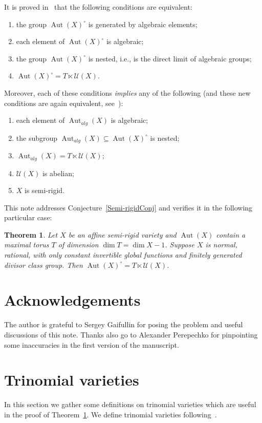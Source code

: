 \documentclass[a4paper,reqno,12pt]{amsart}
\theoremstyle{theorem}
\newtheorem{theorem}{Theorem}[section]
\theoremstyle{definition}
\theoremstyle{theorem}
\theoremstyle{remark}
\DeclareMathOperator{\Aut}{Aut}
\newcommand{\UU}{\mathcal U}
\newcommand{\0}{\circ}
\begin{document}
It is proved in~\cite{PR24} that the following conditions are equivalent:
\begin{enumerate}
    \item[(i)] the group $\Aut(X)^\0$ is generated by algebraic elements;
    \item[(ii)] each element of $\Aut(X)^\circ$ is algebraic;
    \item[(iii)] the group $\Aut(X)^\0$ %
    is nested, i.e., is the direct limit of algebraic groups;
    \item[(iv)] $\Aut(X)^\0 = T\ltimes \UU(X)$.
\end{enumerate}
Moreover, each of these conditions \emph{implies} any of the following (and these new conditions are again equivalent, see~\cite{PR23}):
\begin{enumerate}
    \item[$\bullet$] each element of $\Aut_{alg}(X)$ is algebraic;
    \item[$\bullet$] the subgroup $\Aut_{alg}(X)\subseteq \Aut(X)^\circ$ is nested;
    \item[$\bullet$] $\Aut_{alg}(X) = T\ltimes \UU(X)$;
    \item[$\bullet$] $\UU(X)$ is abelian;
    \item[$\bullet$] $X$ is semi-rigid.
\end{enumerate}

This note addresses Conjecture~\ref{Semi-rigidConj} and verifies it in the following particular case:

\begin{theorem}\label{Theorem}
    Let $X$ be an affine semi-rigid variety and $\Aut(X)$ contain a maximal torus $T$ of dimension $\dim T = \dim X-1$. Suppose $X$ is normal, rational, with only constant invertible global functions and finitely generated divisor class group. Then $\Aut(X)^\circ=T\ltimes\UU(X)$. 
\end{theorem}

\section*{Acknowledgements} The author is grateful to Sergey Gaifullin for posing the problem and useful discussions of this note. Thanks also go to Alexander Perepechko for pinpointing some inaccuracies in the first version of the manuscript.


\section{Trinomial varieties}
In this section we gather some definitions on trinomial varieties which are useful in the proof of Theorem~\ref{Theorem}. 
We define trinomial varieties  following~\cite{HW}.
\end{document}
